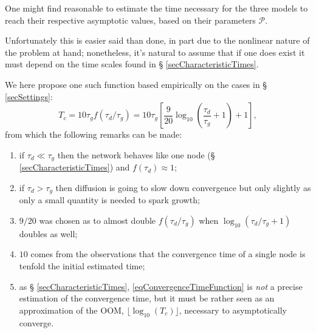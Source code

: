 \documentclass{article}
\begin{document}
                One might find reasonable to estimate the time necessary for the three models to reach their respective asymptotic values, based on their parameters $\mathcal P$.

                Unfortunately this is easier said than done, in part due to the nonlinear nature of the problem at hand; nonetheless, it's natural to assume that if one does exist it must depend on the time scales found in § \ref{secCharacteristicTimes}.

                We here propose one such function based empirically on the cases in § \ref{secSettings}:
                \begin{equation}
                    T_c=10\tau_gf(\tau_d/\tau_g)=10\tau_g\left[\frac9{20}\log_{10}\left(\frac{\tau_d}{\tau_g}+1\right)+1\right],
                    \label{eqConvergenceTimeFunction}
                \end{equation}
                from which the following remarks can be made:

                \begin{enumerate}[
                    label=R\arabic*, %
                    topsep=7.5pt,	  %
                    itemsep=-1pt,	  %
                    leftmargin=30pt,  %
                    rightmargin=20pt, %
                ]
                    \item if $\tau_d\ll\tau_g$ then the network behaves like one no\-de (§ \ref{secCharacteristicTimes}) and $f(\tau_d)\approx1$;
                    \item\label{rmkDiffusionContributionConvergenceTime} if $\tau_d>\tau_g$ then diffusion is going to slow down convergence but only slightly as only a small quantity is needed to spark growth;
                    \item $9/20$ was chosen as to almost double $f(\tau_d/\tau_g)$ when $\log_{10}(\tau_d/\tau_g+1)$ doubles as well\footnotemark{};
                    \item $10$ comes from the observations that the convergence time of a single node is tenfold the initial estimated time;
                    \item as § \ref{secCharacteristicTimes}, \eqref{eqConvergenceTimeFunction} is \textit{not} a precise estimation of the convergence time, but it must be rather seen as an approximation of the OOM, \ie{} $\lfloor\log_{10}(T_c)\rfloor$, necessary to asymptotically converge.
                \end{enumerate}
\end{document}

